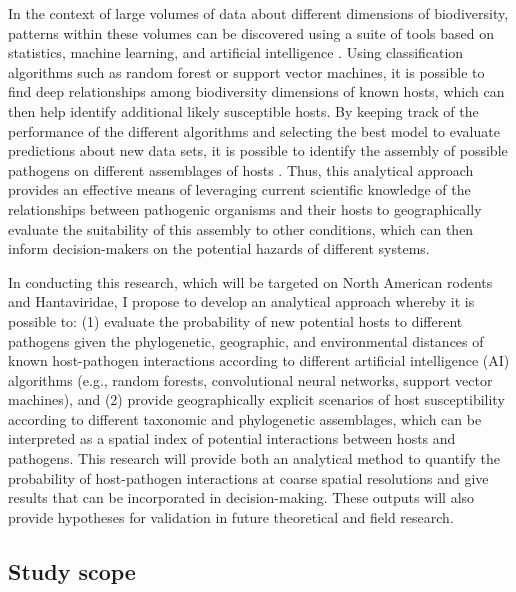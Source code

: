 \documentclass{article}
\begin{document}
In the context of large volumes of data about different dimensions of biodiversity, patterns within these volumes can be discovered using a suite of tools based on statistics, machine learning, and artificial intelligence \cite{alpaydin2020introduction}. Using classification algorithms such as random forest or support vector machines, it is possible to find deep relationships among biodiversity dimensions of known hosts, which can then help identify additional likely susceptible hosts. By keeping track of the performance of the different algorithms and selecting the best model to evaluate predictions about new data sets, it is possible to identify the assembly of possible pathogens on different assemblages of hosts \cite{lantz2019machine}\cite{kuhn2008building}. Thus, this analytical approach provides an effective means of leveraging current scientific knowledge of the relationships between pathogenic organisms and their hosts to geographically evaluate the suitability of this assembly to other conditions, which can then inform decision-makers on the potential hazards of different systems.

In conducting this research, which will be targeted on North American rodents and Hantaviridae, I propose to develop an analytical approach whereby it is possible to: (1) evaluate the probability of new potential hosts to different pathogens given the phylogenetic, geographic, and environmental distances of known host-pathogen interactions according to different artificial intelligence (AI) algorithms (e.g., random forests, convolutional neural networks, support vector machines), and (2) provide geographically explicit scenarios of host susceptibility according to different taxonomic and phylogenetic assemblages, which can be interpreted as a spatial index of potential interactions between hosts and pathogens. This research will provide both an analytical method to quantify the probability of host-pathogen interactions at coarse spatial resolutions and give results that can be incorporated in decision-making. These outputs will also provide hypotheses for validation in future theoretical and field research.

\subsection*{Study scope}
\end{document}
